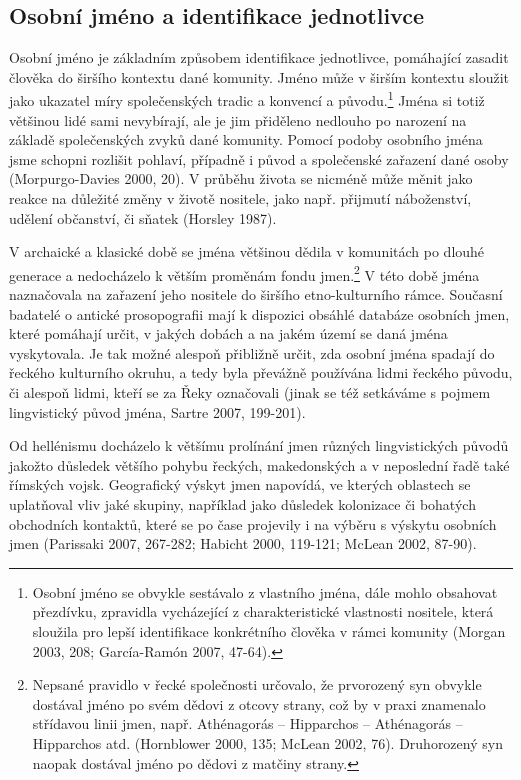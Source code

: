 \subsection[osobní-jméno-a-identifikace-jednotlivce]{Osobní jméno a identifikace jednotlivce}

Osobní jméno je základním způsobem identifikace jednotlivce, pomáhající zasadit člověka do širšího kontextu dané komunity. Jméno může v širším kontextu sloužit jako ukazatel míry společenských tradic a konvencí a původu.\footnote{Osobní jméno se obvykle sestávalo z vlastního jména, dále mohlo obsahovat přezdívku, zpravidla vycházející z charakteristické vlastnosti nositele, která sloužila pro lepší identifikace konkrétního člověka v rámci komunity (Morgan 2003, 208; García-Ramón 2007, 47-64).} Jména si totiž většinou lidé sami nevybírají, ale je jim přiděleno nedlouho po narození na základě společenských zvyků dané komunity. Pomocí podoby osobního jména jsme schopni rozlišit pohlaví, případně i původ a společenské zařazení dané osoby (Morpurgo-Davies 2000, 20). V průběhu života se nicméně může měnit jako reakce na důležité změny v životě nositele, jako např. přijmutí náboženství, udělení občanství, či sňatek (Horsley 1987).

V archaické a klasické době se jména většinou dědila v komunitách po dlouhé generace a nedocházelo k větším proměnám fondu jmen.\footnote{Nepsané pravidlo v řecké společnosti určovalo, že prvorozený syn obvykle dostával jméno po svém dědovi z otcovy strany, což by v praxi znamenalo střídavou linii jmen, např. Athénagorás -- Hipparchos -- Athénagorás -- Hipparchos atd. (Hornblower 2000, 135; McLean 2002, 76). Druhorozený syn naopak dostával jméno po dědovi z matčiny strany.} V této době jména naznačovala na zařazení jeho nositele do širšího etno-kulturního rámce. Současní badatelé o antické prosopografii mají k dispozici obsáhlé databáze osobních jmen, které pomáhají určit, v jakých dobách a na jakém území se daná jména vyskytovala. Je tak možné alespoň přibližně určit, zda osobní jména spadají do řeckého kulturního okruhu, a tedy byla převážně používána lidmi řeckého původu, či alespoň lidmi, kteří se za Řeky označovali (jinak se též setkáváme s pojmem lingvistický původ jména, Sartre 2007, 199-201).

Od hellénismu docházelo k většímu prolínání jmen různých lingvistických původů jakožto důsledek většího pohybu řeckých, makedonských a v neposlední řadě také římských vojsk. Geografický výskyt jmen napovídá, ve kterých oblastech se uplatňoval vliv jaké skupiny, například jako důsledek kolonizace či bohatých obchodních kontaktů, které se po čase projevily i na výběru s výskytu osobních jmen (Parissaki 2007, 267-282; Habicht 2000, 119-121; McLean 2002, 87-90).


